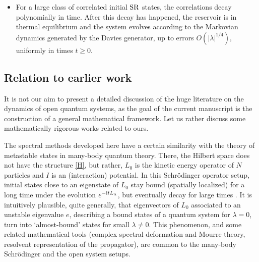 \documentclass[letterpaper,onecolumn,11pt,accepted=2021-12-09]{quantumarticle}
\numberwithin{equation}{section}
\renewcommand{\r}{{\rm R}}
\newcommand{\s}{{\rm S}}
\renewcommand{\i}{{\rm i}}
\begin{document}
\begin{itemize}
\begin{itemize}
		\item For a large class of correlated initial $\s\r$ states, the correlations decay polynomially in time. After this decay has happened, the reservoir is in thermal equilibrium and the system evolves according to the Markovian dynamics generated by the Davies generator, up to errors $O(|\lambda|^{1/4})$, uniformly in times $t\ge 0$. 
	\end{itemize}
\end{itemize}





\subsection{Relation to earlier work}
\label{sect:newresults}


It is not our aim to present a detailed discussion of the huge literature on the dynamics of open quantum systems, as the goal of the current manuscript is the construction of a general mathematical framework. Let us rather discuss some mathematically rigorous works related to ours.  



The spectral methods developed here have a certain similarity with the theory of metastable states in many-body quantum theory. There, the Hilbert space does not have the structure \eqref{H}, but rather, $L_0$ is the kinetic energy operator of $N$ particles and $I$ is an (interaction) potential. In this Schr\"odinger operator setup, initial states close to an eigenstate of $L_0$ stay bound (spatially localized)  for a long time under the evolution $e^{-\i t L_\lambda}$, but eventually decay for large times \cite{Simon, Hunziker1990, HS}. It is intuitively plausible, quite generally, that eigenvectors of $L_0$ associated to an unstable eigenvalue $e$, describing a bound states of a quantum system for $\lambda=0$, turn into `almost-bound' states for small $\lambda\neq 0$. This phenomenon, and some related mathematical tools (complex spectral deformation and Mourre theory, resolvent representation of the propagator), are common to the many-body Schr\"odinger and the open system setups.
\medskip
\end{document}
